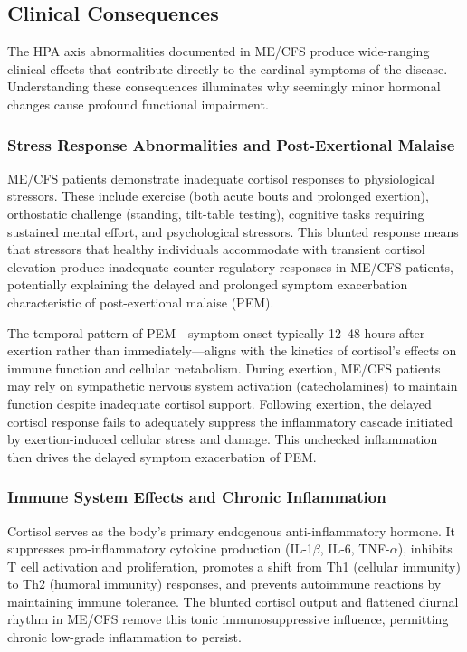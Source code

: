 \subsection{Clinical Consequences}

The HPA axis abnormalities documented in ME/CFS produce wide-ranging clinical effects that contribute directly to the cardinal symptoms of the disease. Understanding these consequences illuminates why seemingly minor hormonal changes cause profound functional impairment.

\subsubsection{Stress Response Abnormalities and Post-Exertional Malaise}

\begin{observation}
\label{obs:stress-response}
ME/CFS patients demonstrate inadequate cortisol responses to physiological stressors. These include exercise (both acute bouts and prolonged exertion), orthostatic challenge (standing, tilt-table testing), cognitive tasks requiring sustained mental effort, and psychological stressors. This blunted response means that stressors that healthy individuals accommodate with transient cortisol elevation produce inadequate counter-regulatory responses in ME/CFS patients, potentially explaining the delayed and prolonged symptom exacerbation characteristic of post-exertional malaise (PEM).
\end{observation}

The temporal pattern of PEM---symptom onset typically 12--48 hours after exertion rather than immediately---aligns with the kinetics of cortisol's effects on immune function and cellular metabolism. During exertion, ME/CFS patients may rely on sympathetic nervous system activation (catecholamines) to maintain function despite inadequate cortisol support. Following exertion, the delayed cortisol response fails to adequately suppress the inflammatory cascade initiated by exertion-induced cellular stress and damage. This unchecked inflammation then drives the delayed symptom exacerbation of PEM.

\subsubsection{Immune System Effects and Chronic Inflammation}

Cortisol serves as the body's primary endogenous anti-inflammatory hormone. It suppresses pro-inflammatory cytokine production (IL-1$\beta$, IL-6, TNF-$\alpha$), inhibits T cell activation and proliferation, promotes a shift from Th1 (cellular immunity) to Th2 (humoral immunity) responses, and prevents autoimmune reactions by maintaining immune tolerance. The blunted cortisol output and flattened diurnal rhythm in ME/CFS remove this tonic immunosuppressive influence, permitting chronic low-grade inflammation to persist.

